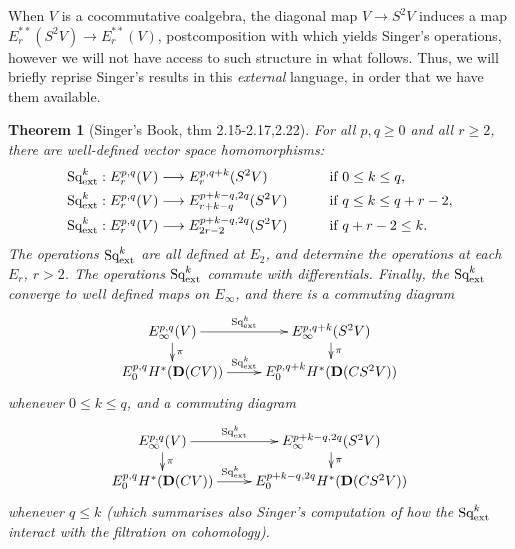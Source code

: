 \documentclass[11pt]{amsart}
\theoremstyle{plain}
\newtheorem{thm}{Theorem}[section]
\theoremstyle{definition}
\renewcommand{\to}{\longrightarrow}
\theoremstyle{plain}
\newcommand{\ExtCohOp}{\textup{Sq}_\textup{ext}}
\newcommand{\dual}{\mathbf{D}}
\begin{document}
\begin{External spectral sequence operations}
When $V$ is a cocommutative coalgebra, the diagonal map $V\to S^2V$ induces a map $E_r^{**}(S^2V)\to E_r^{**}(V)$, postcomposition with which yields Singer's operations, however we will not have access to such structure in what follows. Thus, we will briefly reprise Singer's results in this \emph{external} language, in order that we have them available.
\begin{thm}[Singer's Book, thm 2.15-2.17,2.22]
For all $p,q\geq0$ and all $r\geq2$, there are well-defined vector space homomorphisms:
\begin{alignat*}{2}
\ExtCohOp^k:E^{p,q}_r(V)&\to E^{p,q+k}_r(S^2V)&\qquad&\text{if }0\leq k \leq q,\\
\ExtCohOp^k:E^{p,q}_r(V)&\to E^{p+k-q,2q}_{r+k-q}(S^2V)&\qquad&\text{if }q\leq k\leq q+r-2,\\
\ExtCohOp^k:E^{p,q}_r(V)&\to E^{p+k-q,2q}_{2r-2}(S^2V)&\qquad&\text{if }q+r-2\leq k.
\end{alignat*}
The operations $\ExtCohOp^k$ are all defined at $E_2$, and determine the operations at each $E_r$, $r>2$. The operations $\ExtCohOp^k$ commute with differentials. Finally, the $\ExtCohOp^k$ converge to well defined maps on $E_\infty$, and there is a commuting diagram
\[\xymatrix@R=4mm{
E^{p,q}_\infty(V)\ar[r]^-{\ExtCohOp^k}\ar[d]^-{\pi}
&%
E^{p,q+k}_\infty(S^2V)\ar[d]^-{\pi}
\\%
E_0^{p,q}H^*(\dual(CV))\ar[r]^-{\ExtCohOp^k}&%
E_0^{p,q+k}H^*(\dual(CS^2V))%
}\]
whenever $0\leq k\leq q$, and a commuting diagram
\[\xymatrix@R=4mm{
E^{p,q}_\infty(V)\ar[r]^-{\ExtCohOp^k}\ar[d]^-{\pi}
&%
E^{p+k-q,2q}_\infty(S^2V)\ar[d]^-{\pi}
\\%
E_0^{p,q}H^*(\dual(CV))\ar[r]^-{\ExtCohOp^k}&%
E_0^{p+k-q,2q}H^*(\dual(CS^2V))%
}\]
whenever $q\leq k$ (which summarises also Singer's computation of how the $\ExtCohOp^k$ interact with the filtration on cohomology).


\end{thm}
\end{External spectral sequence operations}
\end{document}
